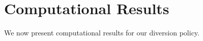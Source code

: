 \section{Computational Results}

We now present computational results for our diversion policy.




